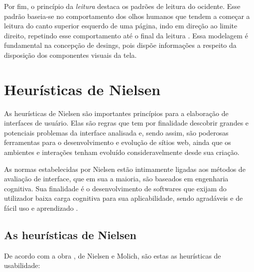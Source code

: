 Por fim, o princípio da \textit{leitura} destaca os padrões de leitura do ocidente. Esse padrão baseia-se no comportamento dos olhos humanos que tendem a começar a leitura do canto superior esquerdo de uma página, indo em direção ao limite direito, repetindo esse comportamento até o final da leitura \cite{lidwell2010}. Essa modelagem é fundamental na concepção de desings, pois dispõe informações a respeito da disposição dos componentes visuais da tela.

\section{Heurísticas de Nielsen}

As heurísticas de Nielsen são importantes princípios para a elaboração de interfaces de usuário. Elas são regras que tem por finalidade descobrir grandes e potenciais problemas da interface analisada \cite{nielsen1994usability} e, sendo assim, são poderosas ferramentas para o desenvolvimento e evolução de sítios web, ainda que os ambientes e interações tenham evoluído consideravelmente desde sua criação.

As normas estabelecidas por Nielsen estão intimamente ligadas aos métodos de avaliação de interface, que em sua a maioria, são baseados em engenharia cognitiva. Sua finalidade é o desenvolvimento de softwares que exijam do utilizador baixa carga cognitiva para sua aplicabilidade, sendo agradáveis e de fácil uso e aprendizado \cite{maciel2004avaliacao}.

\subsection{As heurísticas de Nielsen}

De acordo com a obra \cite{nielsen1994usability}, de Nielsen e Molich, são estas as heurísticas de usabilidade:

